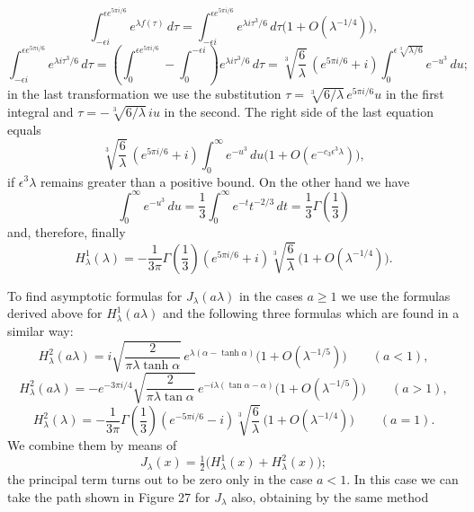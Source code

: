 \[
\int_{-\epsilon i}^{\epsilon e^{5\pi i/6}}e^{\lambda f(\tau)}\,d\tau
=\int_{-\epsilon i}^{\epsilon e^{5\pi i/6}}e^{\lambda i\tau^3/6}\,d\tau
\bigl(1+O(\lambda^{-1/4})\bigr),
\]
\[
\int_{-\epsilon i}^{\epsilon e^{5\pi i/6}}e^{\lambda i\tau^3/6}\,d\tau
=\left(\int_0^{\epsilon e^{5\pi i/6}}-\int_0^{-\epsilon i}\right)e^{\lambda i\tau^3/6}\,d\tau
=\sqrt[3]{\frac6\lambda}\,(e^{5\pi i/6}+i)
\int_0^{\epsilon\sqrt[3]{\lambda/6}}e^{-u^3}\,du;
\]
in the last transformation we use the substitution
$\tau=\sqrt[3]{6/\lambda}\,e^{5\pi i/6}u$ in the first integral and
$\tau=-\sqrt[3]{6/\lambda}\,iu$ in the second. The right side of the last equation equals
\[
\sqrt[3]{\frac6\lambda}\,(e^{5\pi i/6}+i)
\int_0^\infty e^{-u^3}\,du\bigl(1+O(e^{-c_3\epsilon^3\lambda})\bigr),
\]
if $\epsilon^3\lambda$ remains greater than a positive bound. On the other hand we have
\[
\int_0^\infty e^{-u^3}\,du
=\frac13\int_0^\infty e^{-t}t^{-2/3}\,dt
=\frac13\Gamma\!\left(\frac13\right)
\]
and, therefore, finally
\begin{equation}\tag{95}
H_\lambda^1(\lambda)
=-\frac1{3\pi}\Gamma\!\left(\frac13\right)
(e^{5\pi i/6}+i)\sqrt[3]{\frac6\lambda}\,
\bigl(1+O(\lambda^{-1/4})\bigr).
\end{equation}

To find asymptotic formulas for $J_\lambda(a\lambda)$ in the cases $a\ge1$ we use
the formulas derived above for $H_\lambda^1(a\lambda)$ and the following three formulas which are found in a similar way:
\begin{equation}\tag{96}
H_\lambda^2(a\lambda)
=i\sqrt{\frac{2}{\pi\lambda\tanh\alpha}}\,
 e^{\lambda(\alpha-\tanh\alpha)}\bigl(1+O(\lambda^{-1/5})\bigr)
\qquad(a<1),
\end{equation}
\begin{equation}\tag{96'}
H_\lambda^2(a\lambda)
=-e^{-3\pi i/4}\sqrt{\frac{2}{\pi\lambda\tan\alpha}}\,
 e^{-i\lambda(\tan\alpha-\alpha)}\bigl(1+O(\lambda^{-1/5})\bigr)
\qquad(a>1),
\end{equation}
\begin{equation}\tag{96''}
H_\lambda^2(\lambda)
=-\frac1{3\pi}\Gamma\!\left(\frac13\right)(e^{-5\pi i/6}-i)
\sqrt[3]{\frac6\lambda}\,\bigl(1+O(\lambda^{-1/4})\bigr)
\qquad(a=1).
\end{equation}
We combine them by means of
\[
J_\lambda(x)=\tfrac12\bigl(H_\lambda^1(x)+H_\lambda^2(x)\bigr);
\]
the principal term turns out to be zero only in the case $a<1$. In this case we can take the path shown in Figure 27 for $J_\lambda$ also, obtaining by the same method

